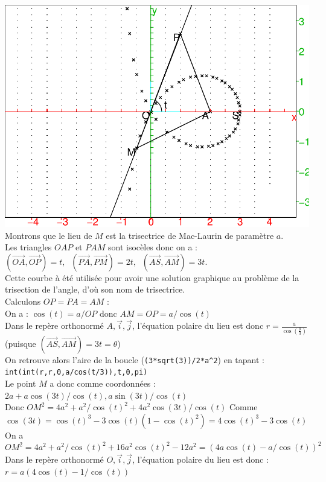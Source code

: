 \documentclass[a4paper,11pt]{book}
\begin{document}
\includegraphics[width=\textwidth]{trisect1}\\
Montrons que le lieu de $M$ est la  trisectrice de Mac-Laurin de 
param\`etre $a$.\\
Les triangles $OAP$ et $PAM$ sont isoc\`eles donc on a :\\
$(\overrightarrow{OA}, \overrightarrow{OP})=t,\ $ 
$(\overrightarrow{PA},\overrightarrow{PM})=2t,\ $ 
$(\overrightarrow{AS},\overrightarrow{AM})=3t$.\\
Cette courbe \`a \'et\'e utilis\'ee pour avoir une solution graphique au 
probl\`eme de la trisection de l'angle, d'o\`u son nom de trisectrice.\\
Calculons $OP=PA=AM$ :\\
On a : $\cos(t)=a/OP$ donc $AM=OP=a/\cos(t)$\\
Dans le rep\`ere orthonorm\'e $A,\overrightarrow i,\overrightarrow j$, 
l'\'equation polaire du lieu est donc 
$\displaystyle r=\frac{a}{\cos(\frac{\theta}{3})}$ (puisque 
$(\overrightarrow{AS},\overrightarrow{AM})=3t=\theta$)\\
On retrouve alors l'aire de la boucle ({\tt (3*sqrt(3))/2*a\verb|^|2})
 en tapant :\\
{\tt int(int(r,r,0,a/cos(t/3)),t,0,pi)}\\
Le point $M$ a donc comme coordonn\'ees :
$2a+a\cos(3t)/\cos(t),a\sin(3t)/\cos(t)$\\
Donc $OM^2=4a^2+a^2/\cos(t)^2+4a^2\cos(3t)/\cos(t)$
Comme $\cos(3t)=\cos(t)^3-3\cos(t)(1-\cos(t)^2)=4\cos(t)^3-3\cos(t)$ \\
On a $OM^2=4a^2+a^2/\cos(t)^2+16a^2\cos(t)^2-12a^2=(4a\cos(t)-a/\cos(t))^2$\\
Dans le rep\`ere orthonorm\'e $O,\overrightarrow i,\overrightarrow j$, 
l'\'equation polaire du lieu est donc :\\
$r=a(4\cos(t)-1/\cos(t))$\\
\end{document}
